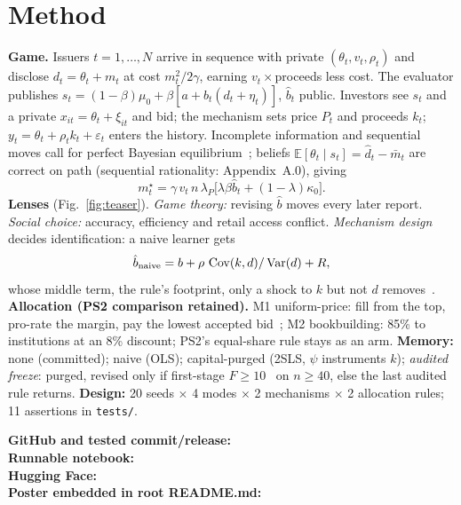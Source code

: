 \section{Method}
\textbf{Game.} Issuers $t=1,\dots,N$ arrive in sequence with private $(\theta_t,v_t,\rho_t)$ and disclose $d_t=\theta_t+m_t$ at cost $m_t^2/2\gamma$, earning $v_t\times$proceeds less cost. The evaluator publishes $s_t=(1-\beta)\mu_0+\beta[a+\hat b_t(d_t+\eta_t)]$, $\hat b_t$ public. Investors see $s_t$ and a private $x_{it}=\theta_t+\xi_{it}$ and bid; the mechanism sets price $P_t$ and proceeds $k_t$; $y_t=\theta_t+\rho_tk_t+\varepsilon_t$ enters the history. Incomplete information and sequential moves call for perfect Bayesian equilibrium~\cite{harsanyi1968,fudenberg1991}; beliefs $\mathbb{E}[\theta_t\mid s_t]=\hat d_t-\bar m_t$ are correct on path (sequential rationality: Appendix~A.0), giving
\begin{equation}
m_t^\star=\gamma\,v_t\,n\,\lambda_P\big[\lambda\beta\hat b_t+(1-\lambda)\kappa_0\big].
\label{eq:br}
\end{equation}
\textbf{Lenses} (Fig.~\ref{fig:teaser}). \emph{Game theory:} revising $\hat b$ moves every later report. \emph{Social choice:} accuracy, efficiency and retail access conflict. \emph{Mechanism design}~\cite{myerson1981} decides identification: a naive learner gets
\begin{equation}
\hat b_{\rm naive}=b+\rho\,\operatorname{Cov}(k,d)/\operatorname{Var}(d)+R,
\label{eq:bias}
\end{equation}
whose middle term, the rule's footprint, only a shock to $k$ but not $d$ removes~\cite{pearl1995}. \textbf{Allocation (PS2 comparison retained).} M1 uniform-price: fill from the top, pro-rate the margin, pay the lowest accepted bid~\cite{milgrom1982}; M2 bookbuilding: 85\% to institutions at an 8\% discount; PS2's equal-share rule stays as an arm. \textbf{Memory:} none (committed); naive (OLS); capital-purged (2SLS, $\psi$ instruments $k$); \emph{audited freeze}: purged, revised only if first-stage $F\ge10$~\cite{staiger1997} on $n\ge40$, else the last audited rule returns. \textbf{Design:} 20 seeds $\times$ 4 modes $\times$ 2 mechanisms $\times$ 2 allocation rules; 11 assertions in \texttt{tests/}.

{\footnotesize\smallskip\noindent\textbf{GitHub and tested commit/release:} \GitHubLink\\
\textbf{Runnable notebook:} \NotebookLink\\
\textbf{Hugging Face:} \HuggingFaceLink\\
\textbf{Poster embedded in root README.md:} \PosterLink\par}

